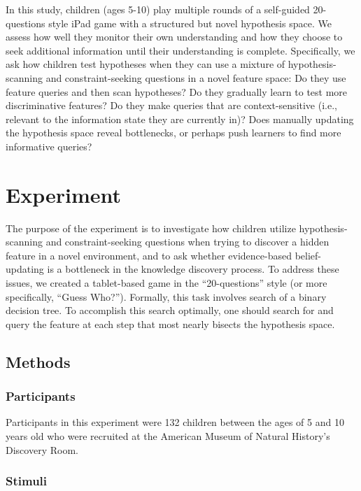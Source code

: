 \documentclass[10pt,letterpaper]{article}
\begin{document}
In this study, children (ages 5-10) play multiple rounds of a self-guided 20-questions style iPad game with a structured but novel hypothesis space. We assess how well they monitor their own understanding and how they choose to seek additional information until their understanding is complete. Specifically, we ask how children test hypotheses when they can use a mixture of hypothesis-scanning and constraint-seeking questions in a novel feature space: Do they use feature queries and then scan hypotheses? Do they gradually learn to test more discriminative features? Do they make queries that are context-sensitive (i.e., relevant to the information state they are currently in)? Does manually updating the hypothesis space reveal bottlenecks, or perhaps push learners to find more informative queries?


\section{Experiment}

The purpose of the experiment is to investigate how children utilize hypothesis-scanning and constraint-seeking questions when trying to discover a hidden feature in a novel environment, and to ask whether evidence-based belief-updating is a bottleneck in the knowledge discovery process. To address these issues, we created a tablet-based game in the ``20-questions'' style (or more specifically, ``Guess Who?''). Formally, this task involves search of a binary decision tree. To accomplish this search optimally, one should search for and query the feature at each step that most nearly bisects the hypothesis space.

\subsection{Methods}

\subsubsection{Participants}

Participants in this experiment were 132 children between the ages of 5 and 10 years old who were recruited at the American Museum of Natural History's Discovery Room.

\subsubsection{Stimuli}
\end{document}
